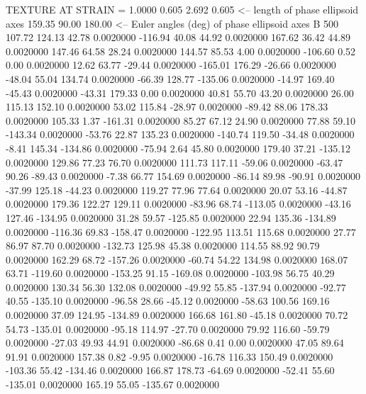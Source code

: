 TEXTURE AT STRAIN =    1.0000
   0.605   2.692   0.605  <-- length of phase ellipsoid axes
  159.35   90.00  180.00  <-- Euler angles (deg) of phase ellipsoid axes
B       500
  107.72  124.13   42.78   0.0020000
 -116.94   40.08   44.92   0.0020000
  167.62   36.42   44.89   0.0020000
  147.46   64.58   28.24   0.0020000
  144.57   85.53    4.00   0.0020000
 -106.60    0.52    0.00   0.0020000
   12.62   63.77  -29.44   0.0020000
 -165.01  176.29  -26.66   0.0020000
  -48.04   55.04  134.74   0.0020000
  -66.39  128.77 -135.06   0.0020000
  -14.97  169.40  -45.43   0.0020000
  -43.31  179.33    0.00   0.0020000
   40.81   55.70   43.20   0.0020000
   26.00  115.13  152.10   0.0020000
   53.02  115.84  -28.97   0.0020000
  -89.42   88.06  178.33   0.0020000
  105.33    1.37 -161.31   0.0020000
   85.27   67.12   24.90   0.0020000
   77.88   59.10 -143.34   0.0020000
  -53.76   22.87  135.23   0.0020000
 -140.74  119.50  -34.48   0.0020000
   -8.41  145.34 -134.86   0.0020000
  -75.94    2.64   45.80   0.0020000
  179.40   37.21 -135.12   0.0020000
  129.86   77.23   76.70   0.0020000
  111.73  117.11  -59.06   0.0020000
  -63.47   90.26  -89.43   0.0020000
   -7.38   66.77  154.69   0.0020000
  -86.14   89.98  -90.91   0.0020000
  -37.99  125.18  -44.23   0.0020000
  119.27   77.96   77.64   0.0020000
   20.07   53.16  -44.87   0.0020000
  179.36  122.27  129.11   0.0020000
  -83.96   68.74 -113.05   0.0020000
  -43.16  127.46 -134.95   0.0020000
   31.28   59.57 -125.85   0.0020000
   22.94  135.36 -134.89   0.0020000
 -116.36   69.83 -158.47   0.0020000
 -122.95  113.51  115.68   0.0020000
   27.77   86.97   87.70   0.0020000
 -132.73  125.98   45.38   0.0020000
  114.55   88.92   90.79   0.0020000
  162.29   68.72 -157.26   0.0020000
  -60.74   54.22  134.98   0.0020000
  168.07   63.71 -119.60   0.0020000
 -153.25   91.15 -169.08   0.0020000
 -103.98   56.75   40.29   0.0020000
  130.34   56.30  132.08   0.0020000
  -49.92   55.85 -137.94   0.0020000
  -92.77   40.55 -135.10   0.0020000
  -96.58   28.66  -45.12   0.0020000
  -58.63  100.56  169.16   0.0020000
   37.09  124.95 -134.89   0.0020000
  166.68  161.80  -45.18   0.0020000
   70.72   54.73 -135.01   0.0020000
  -95.18  114.97  -27.70   0.0020000
   79.92  116.60  -59.79   0.0020000
  -27.03   49.93   44.91   0.0020000
  -86.68    0.41    0.00   0.0020000
   47.05   89.64   91.91   0.0020000
  157.38    0.82   -9.95   0.0020000
  -16.78  116.33  150.49   0.0020000
 -103.36   55.42 -134.46   0.0020000
  166.87  178.73  -64.69   0.0020000
  -52.41   55.60 -135.01   0.0020000
  165.19   55.05 -135.67   0.0020000
